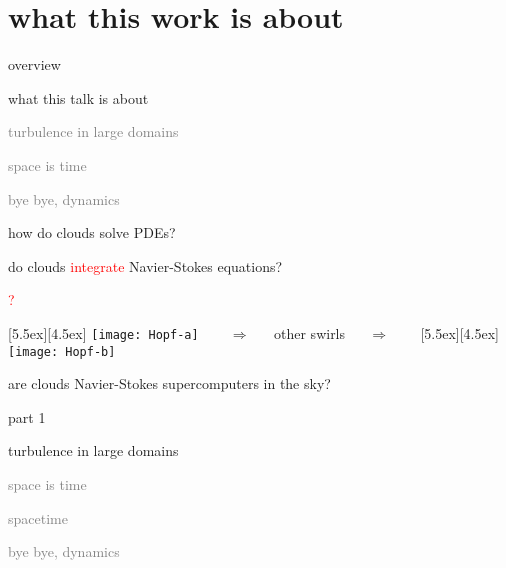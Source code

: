 \begin{frame}
  \titlepage
\end{frame}


\section[what this work is about]
 {what this work is about}

\begin{frame}{overview}
\begin{enumerate}
              \item {\Large
what this talk is about
                  }\textcolor{gray}{\small
              \item
turbulence in large domains
              \item
space is time
              \item
bye bye, dynamics
                    }
            \end{enumerate}
\end{frame}

\begin{frame}{how do clouds solve PDEs?}

\vfill

do clouds \textcolor{red}{integrate} Navier-Stokes equations?

\begin{center}
\centerline{\textcolor{red}{\Huge ?}}

\begin{minipage}[t]{\textwidth}
	\begin{center}
\centerline{
\raisebox{-4.0ex}[5.5ex][4.5ex]
		 {\texttt{[image: Hopf-a]}}
~~~ $\Longrightarrow$ ~~ {other swirls} ~~ $\Longrightarrow$ ~~~
	\raisebox{-4.0ex}[5.5ex][4.5ex]
		 {\texttt{[image: Hopf-b]}}
          }
	\end{center}
\end{minipage}
\end{center}

are clouds Navier-Stokes supercomputers in the sky?

\end{frame}

\begin{frame}{part 1}
\begin{enumerate}
              \item {\Large
turbulence in large domains
                  }\textcolor{gray}{\small
              \item
space is time
              \item
spacetime
              \item
bye bye, dynamics
                    }
            \end{enumerate}
\end{frame}


